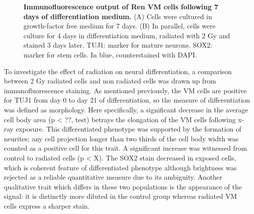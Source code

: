 \documentclass[onecolumn,10pt]{asme2ej}
\begin{document}
\begin{figure}[h]
	\caption{\textbf{Immunofluorescence output of Ren VM cells following 7 days of differentiation medium.} (A) Cells were cultured in growth-factor free medium for 7 days. (B) In parallel, cells were culture for 4 days in differentiation medium, radiated with 2 Gy and stained 3 days later.
	TUJ1: marker for mature neurons.
	SOX2: marker for stem cells.
	In blue, counterstained with DAPI.
}
	\label{differentiation&radiation}
\end{figure}

To investigate the effect of radiation on neural differentiation, a comparison between 2 Gy radiated cells and non radiated cells was drawn up from immunofluorescence staining. As mentioned previously, the VM cells are positive for TUJ1 from day 0 to day 21 of differentiation, so the measure of differentiation was defined as morphology. Here specifically, a significant decrease in the average cell body area (p < ??, test) betrays the elongation of the VM cells following x-ray exposure. This differentiated phenotype was supported by the formation of neurites; any cell projection longer than two thirds of the cell body width was counted as a positive cell for this trait. A significant increase was witnessed from control to radiated cells (p < X). 
The SOX2 stain decreased in exposed cells, which is coherent feature of differentiated phenotype although brightness was rejected as a reliable quantitative measure due to its ambiguity. Another qualitative trait which differs in these two populations is the appearance of the signal: it is distinctly more diluted in the control group whereas radiated VM cells express a sharper stain. 
\end{document}
